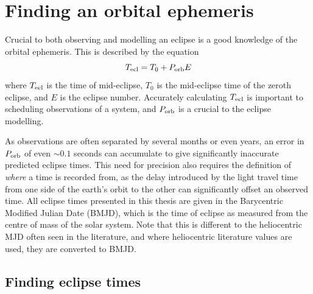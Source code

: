 \section{Finding an orbital ephemeris}
\label{sect:modelling:getting ephemeris}

Crucial to both observing and modelling an eclipse is a good knowledge of the orbital ephemeris. This is described by the equation
\begin{equation}
    \label{eqn:modelling:general ephemeris equation}
    T_{\rm ecl} = T_0 + P_{\rm orb} E
\end{equation}
where $T_{\rm ecl}$ is the time of mid-eclipse, $T_0$ is the mid-eclipse time of the zeroth eclipse, and $E$ is the eclipse number. Accurately calculating $T_{\rm ecl}$ is important to scheduling observations of a system, and $P_{\rm orb}$ is a crucial to the eclipse modelling.

As observations are often separated by several months or even years, an error in $P_{\rm orb}$ of even $\sim 0.1$ seconds can accumulate to give significantly inaccurate predicted eclipse times. This need for precision also requires the definition of {\it where} a time is recorded from, as the delay introduced by the light travel time from one side of the earth's orbit to the other can significantly offset an observed time. All eclipse times presented in this thesis are given in the Barycentric Modified Julian Date (BMJD), which is the time of eclipse as measured from the centre of mass of the solar system. Note that this is different to the heliocentric MJD often seen in the literature, and where heliocentric literature values are used, they are converted to BMJD.

\subsection{Finding eclipse times}
\label{sect:modelling:finding eclipse times}

